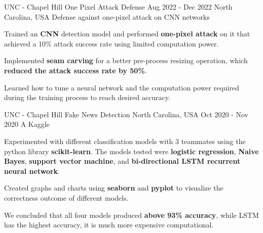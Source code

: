 

\begin{cventries}


  \cventry
    {UNC - Chapel Hill} %
    {One Pixel Attack Defense} %
    {Aug 2022 - Dec 2022} %
    {North Carolina, USA} %
    {Defense against one-pixel attack on CNN networks}
    {
      \begin{cvitems} %
        \item {Trained an \textbf{CNN} detection model and performed \textbf{one-pixel attack} on it that achieved a 10\% attack success rate using limited computation power.}
        \item {Implemented \textbf{seam carving} for a better pre-process resizing operation, which \textbf{reduced the attack success rate by 50\%}.}
        \item {Learned how to tune a neural network and the computation power required during the training process to reach desired accuracy.}
      \end{cvitems}
    }


  \cventry
    {UNC - Chapel Hill} %
    {Fake News Detection} %
    {North Carolina, USA} %
    {Oct 2020 - Nov 2020} %
    {A Kaggle }
    {
      \begin{cvitems} %
        \item {Experimented with different classification models with 3 teammates using the python library \textbf{scikit-learn}. The models tested were \textbf{logistic regression}, \textbf{Naive Bayes}, \textbf{support vector machine}, and \textbf{bi-directional LSTM recurrent neural network}.}
        \item {Created graphs and charts using \textbf{seaborn} and \textbf{pyplot} to visualize the correctness outcome of different models.}
        \item {We concluded that all four models produced  \textbf{above 93\% accuracy}, while LSTM has the highest accuracy, it is much more expensive computational.}
      \end{cvitems}
    }


\end{cventries}
